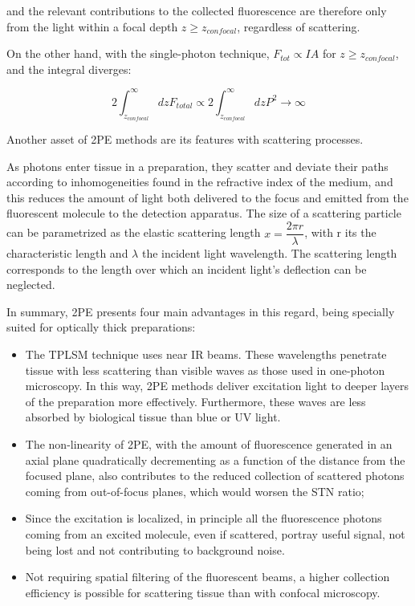 and the relevant contributions to the collected fluorescence are therefore only from the light within a focal depth $z \geqslant z_{confocal}$, regardless of scattering.

On the other hand, with the single-photon technique, $F_{tot} \propto I A$ for $z \geqslant z_{confocal}$, and the integral diverges:

\begin{equation}
2 \int_{z_{confocal}}^{\infty} dz F_{total} \propto  2 \int_{z_{confocal}}^{\infty} dz P^2 \to \infty
\end{equation}


Another asset of 2PE methods are its features with scattering processes.

As photons enter tissue in a preparation, they scatter and deviate their paths according to inhomogeneities found in the refractive index of the medium, and this reduces the amount of light both delivered to the focus and emitted from the fluorescent molecule to the detection apparatus. The size of a scattering particle can be parametrized as the elastic scattering length $x = \dfrac{2 \pi r}{\lambda}$, with r its the characteristic length and $\lambda$ the incident light wavelength. The scattering length corresponds to the length over which an incident light's deflection can be neglected.

In summary, 2PE presents four main advantages in this regard, being specially suited for optically thick preparations:

\begin{itemize}
\item The TPLSM technique uses near IR beams. These wavelengths penetrate tissue with less scattering than visible waves as those used in one-photon microscopy. In this way, 2PE methods deliver excitation light to deeper layers of the preparation more effectively. Furthermore, these waves are less absorbed by biological tissue than blue or UV light.
\item The non-linearity of 2PE, with the amount of fluorescence generated in an axial plane quadratically decrementing as a function of the distance from the focused plane, also contributes to the reduced collection of scattered photons coming from out-of-focus planes, which would worsen the STN ratio;
\item Since the excitation is localized, in principle all the fluorescence photons coming from an excited molecule, even if scattered, portray useful signal, not being lost and not contributing to background noise.
\item Not requiring spatial filtering of the fluorescent beams, a higher collection efficiency is possible for scattering tissue than with confocal microscopy.
\end{itemize}

